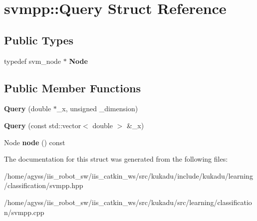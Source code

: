 \hypertarget{structsvmpp_1_1Query}{}\section{svmpp\+:\+:Query Struct Reference}
\label{structsvmpp_1_1Query}
\subsection*{Public Types}
\begin{DoxyCompactItemize}
\item 
typedef svm\+\_\+node $\ast$ {\bfseries Node}\hypertarget{structsvmpp_1_1Query_ad4ae25342b26d3342199b286e1468031}{}\label{structsvmpp_1_1Query_ad4ae25342b26d3342199b286e1468031}

\end{DoxyCompactItemize}
\subsection*{Public Member Functions}
\begin{DoxyCompactItemize}
\item 
{\bfseries Query} (double $\ast$\+\_\+x, unsigned \+\_\+dimension)\hypertarget{structsvmpp_1_1Query_a77dd9f9c5f6b1a1facfa6579e83f62a9}{}\label{structsvmpp_1_1Query_a77dd9f9c5f6b1a1facfa6579e83f62a9}

\item 
{\bfseries Query} (const std\+::vector$<$ double $>$ \&\+\_\+x)\hypertarget{structsvmpp_1_1Query_a61394015e3a83c92094e38a991c4ed92}{}\label{structsvmpp_1_1Query_a61394015e3a83c92094e38a991c4ed92}

\item 
Node {\bfseries node} () const \hypertarget{structsvmpp_1_1Query_a2333b79e16a7fbe004b18b7e1bebd27b}{}\label{structsvmpp_1_1Query_a2333b79e16a7fbe004b18b7e1bebd27b}

\end{DoxyCompactItemize}


The documentation for this struct was generated from the following files\+:\begin{DoxyCompactItemize}
\item 
/home/agyss/iis\+\_\+robot\+\_\+sw/iis\+\_\+catkin\+\_\+ws/src/kukadu/include/kukadu/learning/classification/svmpp.\+hpp\item 
/home/agyss/iis\+\_\+robot\+\_\+sw/iis\+\_\+catkin\+\_\+ws/src/kukadu/src/learning/classification/svmpp.\+cpp\end{DoxyCompactItemize}
